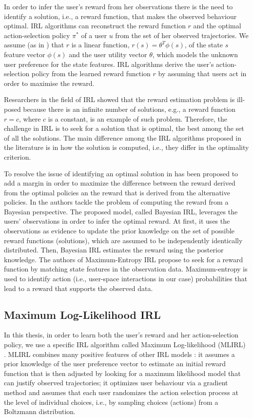In order to infer the user's reward from her observations there is the need to identify a solution, i.e., a reward function, that makes the observed behaviour optimal. 
IRL algorithms can reconstruct the reward function $r$ and the optimal action-selection policy $\pi^*$ of a user $u$ from the set of her observed trajectories. We assume (as in \cite{ng:2000}) that $r$ is a linear function, $r(s) = \theta^T\phi(s)$, of the state $s$ feature vector $\phi(s)$ and the user utility vector $\theta$, which models the unknown user preference for the state features. IRL algorithms derive the user's action-selection policy from the learned reward function $r$ by assuming that users act in order to maximise the reward.

Researchers in the field of IRL showed that the reward estimation problem is ill-posed because there is an infinite number of solutions, e.g., a reward function $r=c$, where $c$ is a constant, is an example of such problem.
Therefore, the challenge in IRL is to seek for a solution that is optimal, the best among the set of all the solutions. 
The main difference among the IRL algorithms proposed in the literature is in how the solution is computed, i.e., they differ in the optimality criterion.

To resolve the issue of identifying an optimal solution in \cite{ng:2000,irl:optimal_solution:2006} has been proposed to add a margin in order to maximize the difference between the reward derived from the optimal policies an the reward that is derived from the alternative policies.
%
In \cite{bayesianIRL} the authors tackle the problem of computing the reward from a Bayesian perspective. The proposed model, called Bayesian IRL, leverages the users' observations in order to infer the optimal reward. At first, it uses the observations as evidence to update the prior knowledge on the set of possible reward functions (solutions), which are assumed to be independently identically distributed. Then, Bayesian IRL estimates the reward using the posterior knowledge.
%
The authors of Maximum-Entropy IRL \cite{maxentirl} propose to seek for a reward function by matching state features in the observation data. Maximum-entropy is used to identify action (i.e., user-space interactions in our case) probabilities that lead to a reward that supports the observed data.


\subsection{Maximum Log-Likelihood IRL}
In this thesis, in order to learn both the user's reward and her action-selection policy, we use a specific IRL algorithm called Maximum Log-likelihood (MLIRL) \cite{vro:litt:2011}. 
MLIRL combines many positive features of other IRL models \cite{bayesianIRL,maxentirl,policymatchingirl}: it assumes a prior knowledge of the user preference vector to estimate an initial reward function that is then adjusted by looking for a maximum likelihood model that can justify observed trajectories; it optimizes user behaviour via a gradient method and assumes that each user randomizes the action selection process at the level of individual choices, i.e., by sampling choices (actions) from a Boltzmann distribution. 

